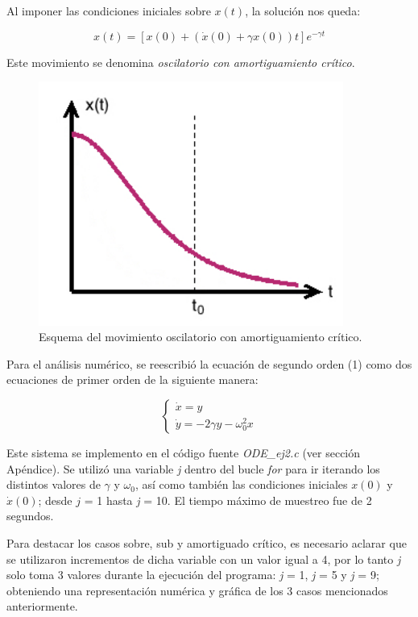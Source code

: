 \documentclass[a4paper,12pt]{article}
\begin{document}
\begin{itemize}
Al imponer las condiciones iniciales sobre $x(t)$, la soluci\'on nos queda:

\begin{equation}
x(t) = [x(0) + (\dot{x}(0) + \gamma x(0))t]e^{-\gamma t}
\end{equation}

Este movimiento se denomina \textit{oscilatorio con amortiguamiento cr\'itico}.

\begin{figure}[H]
\begin{center}
\includegraphics[height=8cm]{oscilacion_amortiguada_c.jpg}
\caption[width=5cm]{Esquema del movimiento oscilatorio con amortiguamiento cr\'itico.}
\end{center}
\end{figure}

\end{itemize}

Para el an\'alisis num\'erico, se reescribi\'o la ecuaci\'on de segundo orden (1) como dos ecuaciones de primer orden de la siguiente manera:

$$ \begin{cases} \dot{x} = y \\ \dot{y} = -2\gamma y - \omega_0^2 x \end{cases} $$

Este sistema se implemento en el c\'odigo fuente \textit{ODE\_ej2.c} (ver secci\'on Ap\'endice). Se utiliz\'o una variable \textit{j} dentro del bucle \textit{for} para ir iterando los distintos valores de $\gamma$ y $\omega_0$, as\'i como tambi\'en las condiciones iniciales $x(0)$ y $\dot{x}(0)$; desde $j$ = 1 hasta \textit{j} = 10. El tiempo m\'aximo de muestreo fue de 2 segundos.

Para destacar los casos sobre, sub y amortiguado cr\'itico, es necesario aclarar que se utilizaron incrementos de dicha variable con un valor igual a 4, por lo tanto \textit{j} solo toma 3 valores durante la ejecuci\'on del programa: \textit{j} = 1, \textit{j} = 5 y \textit{j} = 9; obteniendo una representaci\'on num\'erica y gr\'afica de los 3 casos mencionados anteriormente.
\end{document}
